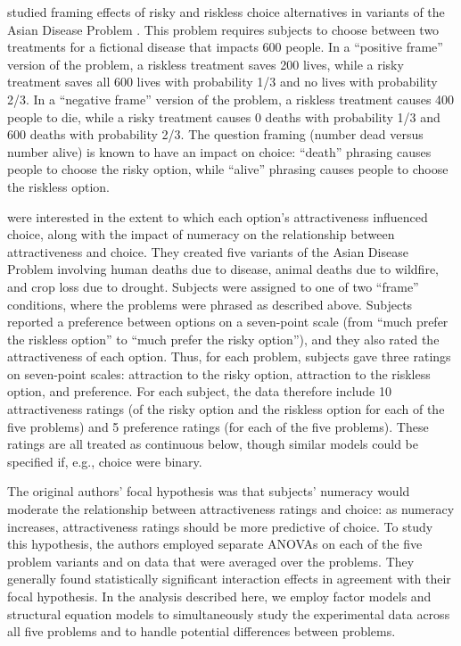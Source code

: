  studied framing effects of risky and riskless choice alternatives in variants of the Asian Disease Problem \cite{tvekah81}.  This problem requires subjects to choose between two treatments for a fictional disease that impacts 600 people.  In a ``positive frame'' version of the problem, a riskless treatment saves 200 lives, while a risky treatment saves all 600 lives with probability 1/3 and no lives with probability 2/3.  In a ``negative frame'' version of the problem, a riskless treatment causes 400 people to die, while a risky treatment causes 0 deaths with probability 1/3 and 600 deaths with probability 2/3.  The question framing (number dead versus number alive) is known to have an impact on choice: ``death'' phrasing causes people to choose the risky option, while ``alive'' phrasing causes people to choose the riskless option.

 were interested in the extent to which each option's attractiveness influenced choice, along with the impact of numeracy on the relationship between attractiveness and choice.  They created five variants of the Asian Disease Problem involving human deaths due to disease, animal deaths due to wildfire, and crop loss due to drought.  Subjects were assigned to one of two ``frame'' conditions, where the problems were phrased as described above.  Subjects reported a preference between options on a seven-point scale (from ``much prefer the riskless option'' to ``much prefer the risky option''), and they also rated the attractiveness of each option.  Thus, for each problem, subjects gave three ratings on seven-point scales: attraction to the risky option, attraction to the riskless option, and preference.  For each subject, the data therefore include 10 attractiveness ratings (of the risky option and the riskless option for each of the five problems) and 5 preference ratings (for each of the five problems). These ratings are all treated as continuous below, though similar models could be specified if, e.g., choice were binary.

The original authors' focal hypothesis was that  subjects' numeracy would moderate the relationship between attractiveness ratings and choice: as numeracy increases, attractiveness ratings should be more predictive of choice.   To study this hypothesis, the authors employed separate ANOVAs on each of the five problem variants and on data that were averaged over the problems.  They generally found statistically significant interaction effects in agreement with their focal hypothesis. In the analysis described here, we employ factor models and structural equation models to simultaneously  study the experimental data across all five problems and to handle potential differences between problems.  

